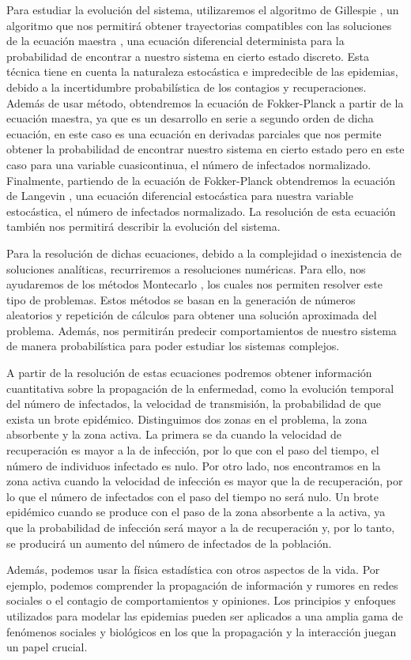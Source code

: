 Para estudiar la evolución del sistema, utilizaremos el algoritmo de Gillespie \cite{Gillespie}, un algoritmo que nos permitirá obtener 
trayectorias compatibles con las soluciones de la ecuación maestra \cite{McKane,Toral}, una ecuación diferencial determinista para la 
probabilidad de encontrar a nuestro sistema en cierto estado discreto. Esta técnica tiene en cuenta la naturaleza estocástica 
e impredecible de las epidemias, debido a la incertidumbre probabilística de los contagios y recuperaciones. Además de usar método,
obtendremos la ecuación de Fokker-Planck \cite{McKane,Toral} a partir de la ecuación maestra, ya que es un desarrollo en serie a segundo orden 
de dicha ecuación, en este caso es una ecuación en derivadas parciales que nos permite obtener la probabilidad de encontrar nuestro sistema 
en cierto estado pero en este caso para una variable cuasicontinua, el número de infectados normalizado. Finalmente, partiendo de la ecuación 
de Fokker-Planck obtendremos la ecuación de Langevin \cite{McKane}, una ecuación diferencial estocástica para nuestra variable estocástica, 
el número de infectados normalizado. La resolución de esta ecuación también nos permitirá describir la evolución del sistema.

Para la resolución de dichas ecuaciones, debido a la complejidad o inexistencia de soluciones analíticas, recurriremos a resoluciones 
numéricas. Para ello, nos ayudaremos de los métodos Montecarlo \cite{kroese2014monte}, los cuales nos permiten resolver este tipo de problemas. Estos métodos
se basan en la generación de números aleatorios y repetición de cálculos para obtener una solución aproximada del problema. Además, nos 
permitirán predecir comportamientos de nuestro sistema de manera probabilística para poder estudiar los sistemas complejos.

A partir de la resolución de estas ecuaciones podremos obtener información cuantitativa sobre la propagación de la enfermedad, 
como la evolución temporal del número de infectados, la velocidad de transmisión, la probabilidad de que exista un brote epidémico. 
Distinguimos dos zonas en el problema, la zona absorbente y la zona activa. La primera se da cuando la velocidad de recuperación 
es mayor a la de infección, por lo que con el paso del tiempo, el número de individuos infectado es nulo. Por otro lado, nos encontramos en
la zona activa cuando la velocidad de infección es mayor que la de recuperación, por lo que el número de infectados con el paso del tiempo
no será nulo. Un brote epidémico cuando se produce con el paso de la zona absorbente a la activa, ya que la probabilidad de infección será 
mayor a la de recuperación y, por lo tanto, se producirá un aumento del número de infectados de la población.

Además, podemos usar la física estadística con otros aspectos de la vida. Por ejemplo, podemos comprender la propagación de información y rumores en redes sociales \cite{castellano2009statistical} 
o el contagio de comportamientos y opiniones. Los principios y enfoques utilizados para modelar las epidemias pueden ser aplicados
a una amplia gama de fenómenos sociales y biológicos \cite{azaele2016statistical} en los que la propagación 
y la interacción juegan un papel crucial.